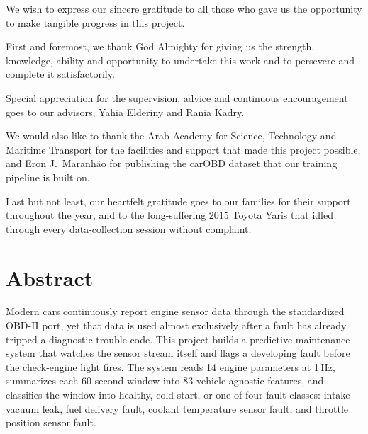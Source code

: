 We wish to express our sincere gratitude to all those who gave us the
opportunity to make tangible progress in this project.

First and foremost, we thank God Almighty for giving us the strength,
knowledge, ability and opportunity to undertake this work and to persevere
and complete it satisfactorily.

Special appreciation for the supervision, advice and continuous encouragement
goes to our advisors, Yahia Elderiny and Rania Kadry.

We would also like to thank the Arab Academy for Science, Technology and
Maritime Transport for the facilities and support that made this project
possible, and Eron J.\ Maranh\~ao for publishing the carOBD dataset that our
training pipeline is built on.

Last but not least, our heartfelt gratitude goes to our families for their
support throughout the year, and to the long-suffering 2015 Toyota Yaris that
idled through every data-collection session without complaint.

\clearpage
\section*{Abstract}

Modern cars continuously report engine sensor data through the standardized
OBD-II port, yet that data is used almost exclusively after a fault has
already tripped a diagnostic trouble code. This project builds a predictive
maintenance system that watches the sensor stream itself and flags a
developing fault before the check-engine light fires. The system reads
14 engine parameters at 1\,Hz, summarizes each 60-second window into 83
vehicle-agnostic features, and classifies the window into healthy,
cold-start, or one of four fault classes: intake vacuum leak, fuel delivery
fault, coolant temperature sensor fault, and throttle position sensor fault.

